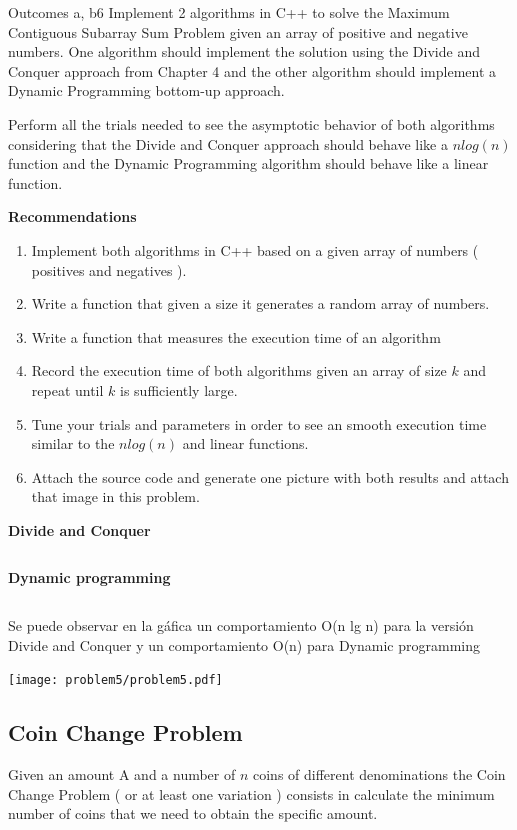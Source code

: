 \begin{problem}{Outcomes a, b}{6}
    Implement 2 algorithms in C++ to solve the Maximum Contiguous Subarray Sum Problem given an array of positive and negative numbers.
    One algorithm should implement the solution using the Divide and Conquer approach from Chapter 4 
    and the other algorithm should implement a Dynamic Programming bottom-up approach.\newline

    Perform all the trials needed to see the asymptotic behavior of both algorithms considering that the Divide and Conquer approach should behave like a $nlog(n)$ function and the Dynamic Programming algorithm should behave like a linear function.\newline

    \textbf{Recommendations}
    \begin{enumerate}
        \item Implement both algorithms in C++ based on a given array of numbers ( positives and negatives ).
        \item Write a function that given a size it generates a random array of numbers.
        \item Write a function that measures the execution time of an algorithm
        \item Record the execution time of both algorithms given an array of size $k$ and repeat until $k$ is sufficiently large.
        \item Tune your trials and parameters in order to see an smooth execution time similar to the $nlog(n)$ and linear functions.
        \item Attach the source code and generate one picture with both results and attach that image in this problem. 
    \end{enumerate}
    \textbf{Divide and Conquer}
    \inputminted[fontsize=\small,breaklines]{cpp}{answers/problem5/problem5dc.cpp}
    \textbf{Dynamic programming}
    \inputminted[fontsize=\small,breaklines]{cpp}{answers/problem5/problem5dp.cpp}
    Se puede observar en la gáfica un comportamiento O(n lg n) para la versión Divide and Conquer y un comportamiento O(n) para Dynamic programming
    \begin{center}
        \texttt{[image: problem5/problem5.pdf]}%
    \end{center}
\end{problem}


\subsection{Coin Change Problem}
Given an amount A and a number of $n$ coins of different denominations the Coin Change Problem ( or at least one variation ) consists in calculate the minimum number of coins that we need to obtain the specific amount. \newline


